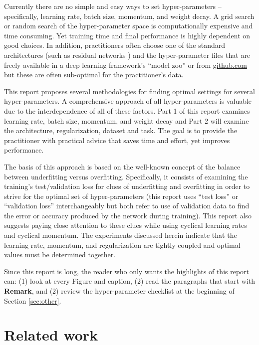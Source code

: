 \documentclass{article} %
\begin{document}
Currently there are no simple and easy ways to  set hyper-parameters -- specifically, learning rate, batch size, momentum, and weight decay. A grid search or random search \citep{bergstra2012random} of the hyper-parameter space is computationally  expensive and time consuming.  Yet training time and final performance is highly dependent on good choices.  In addition, practitioners often choose one of the standard architectures (such as  residual networks \citep{he2016deep}) and the hyper-parameter files that are freely available in a deep learning framework's ``model zoo'' or from \url{github.com} but these are often sub-optimal for the practitioner's data.  

This report proposes several methodologies for finding optimal settings for several hyper-parameters.  A comprehensive approach of all hyper-parameters is valuable due to the interdependence of all of these factors.  Part 1 of this report examines learning rate, batch size, momentum, and weight decay and Part 2 will examine the architecture, regularization, dataset and task.  The goal is to provide the practitioner with practical advice that saves time and effort, yet improves performance.

The basis of this approach is based on the well-known concept of the balance between underfitting versus overfitting.  Specifically, it consists of examining the training's test/validation loss for clues of underfitting and overfitting in order to strive for the optimal set of hyper-parameters (this report uses ``test loss'' or ``validation loss'' interchangeably but both refer to use of validation data to find the error or accuracy produced by the network during training).  This report also suggests paying close attention to these clues while using cyclical learning rates \citep{smith2017cyclical} and cyclical momentum.  The experiments discussed herein indicate that the learning rate, momentum, and regularization are tightly coupled and optimal values must be determined together. 

Since this report is long, the reader who only wants the  highlights of this report can: (1) look at every Figure and caption, (2) read the paragraphs that start with \textbf{Remark}, and (2) review the hyper-parameter checklist at the beginning of Section \ref{sec:other}.


\section{Related work}
\label{sec:related}
\end{document}
